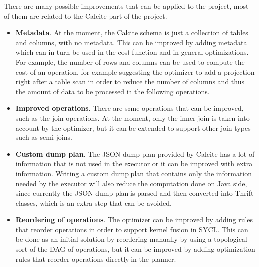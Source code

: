 \documentclass[a4paper, 10pt]{article}
\begin{document}
There are many possible improvements that can be applied to the project, most of them are related to the Calcite part of the project.
\begin{itemize}
    \item \textbf{Metadata}. At the moment, the Calcite schema is just a collection of tables and columns, with no metadata. This can be improved by adding metadata which can in turn be used in the cost function and in general optimizations. For example, the number of rows and columns can be used to compute the cost of an operation, for example suggesting the optimizer to add a projection right after a table scan in order to reduce the number of columns and thus the amount of data to be processed in the following operations.
    \item \textbf{Improved operations}. There are some operations that can be improved, such as the join operations. At the moment, only the inner join is taken into account by the optimizer, but it can be extended to support other join types such as semi joins.
    \item \textbf{Custom dump plan}. The JSON dump plan provided by Calcite has a lot of information that is not used in the executor or it can be improved with extra information. Writing a custom dump plan that contains only the information needed by the executor will also reduce the computation done on Java side, since currently the JSON dump plan is parsed and then converted into Thrift classes, which is an extra step that can be avoided.
    \item \textbf{Reordering of operations}. The optimizer can be improved by adding rules that reorder operations in order to support kernel fusion in SYCL. This can be done as an initial solution by reordering manually by using a topological sort of the DAG of operations, but it can be improved by adding optimization rules that reorder operations directly in the planner.
\end{itemize}
\end{document}
